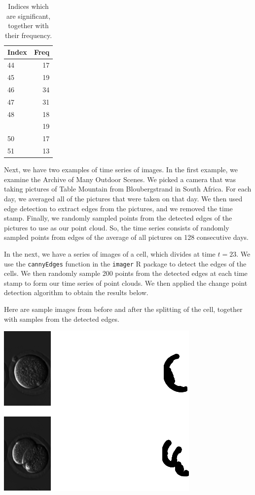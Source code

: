 \documentclass[smallextended]{svjour3}       %
\begin{document}
\begin{longtable}[t]{lr}
\caption{\label{tab:unnamed-chunk-3}Indices which are significant, together with their frequency.}\\
\toprule
Index & Freq\\
\midrule
44 & 17\\
45 & 19\\
46 & 34\\
47 & 31\\
48 & 18\\
\addlinespace
49 & 19\\
50 & 17\\
51 & 13\\
\bottomrule
\end{longtable}

Next, we have two examples of time series of images. In the first
example, we examine the Archive of Many Outdoor Scenes. We picked a
camera that was taking pictures of Table Mountain from Bloubergstrand in
South Africa. For each day, we averaged all of the pictures that were
taken on that day. We then used edge detection to extract edges from the
pictures, and we removed the time stamp. Finally, we randomly sampled
points from the detected edges of the pictures to use as our point
cloud. So, the time series consists of randomly sampled points from
edges of the average of all pictures on 128 consecutive days.

In the next, we have a series of images of a cell, which divides at time
\(t = 23\). We use the \texttt{cannyEdges} function in the
\texttt{imager} R package to detect the edges of the cells. We then
randomly sample 200 points from the detected edges at each time stamp to
form our time series of point clouds. We then applied the change point
detection algorithm to obtain the results below.

Here are sample images from before and after the splitting of the cell,
together with samples from the detected edges.

\begin{center}\includegraphics{springer_template_files/figure-latex/chunk_10_5-1} \end{center}
\end{document}
